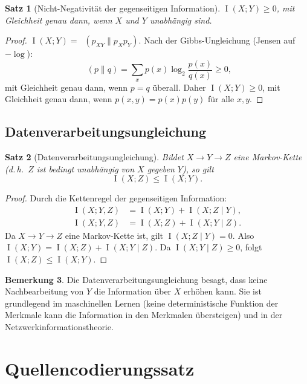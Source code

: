 \documentclass[12pt,a4paper]{amsart}
\newtheorem{theorem}{Satz}[section]
\theoremstyle{definition}
\newtheorem{bemerkung}[theorem]{Bemerkung}
\theoremstyle{remark}
\DeclareMathOperator{\MI}{I}
\DeclareMathOperator{\KL}{D_{KL}}
\begin{document}
\begin{theorem}[Nicht-Negativität der gegenseitigen Information]\label{satz:mi-nichtneg}
$\MI(X;Y) \geq 0$, mit Gleichheit genau dann, wenn $X$ und $Y$ unabhängig sind.
\end{theorem}
\begin{proof}
$\MI(X;Y) = \KL(p_{XY}\|p_Xp_Y)$. Nach der Gibbs-Ungleichung (Jensen auf
$-\log$):
\[
  \KL(p \| q) = \sum_x p(x)\log_2\frac{p(x)}{q(x)} \geq 0,
\]
mit Gleichheit genau dann, wenn $p = q$ überall. Daher $\MI(X;Y) \geq 0$, mit
Gleichheit genau dann, wenn $p(x,y) = p(x)p(y)$ für alle $x,y$.
\end{proof}

\subsection{Datenverarbeitungsungleichung}

\begin{theorem}[Datenverarbeitungsungleichung]\label{satz:dpu}
Bildet $X \to Y \to Z$ eine Markov-Kette (d.\,h.\ $Z$ ist bedingt unabhängig
von $X$ gegeben $Y$), so gilt
\[
  \MI(X;Z) \leq \MI(X;Y).
\]
\end{theorem}
\begin{proof}
Durch die Kettenregel der gegenseitigen Information:
\begin{align*}
  \MI(X;Y,Z) &= \MI(X;Y) + \MI(X;Z\mid Y), \\
  \MI(X;Y,Z) &= \MI(X;Z) + \MI(X;Y\mid Z).
\end{align*}
Da $X \to Y \to Z$ eine Markov-Kette ist, gilt $\MI(X;Z \mid Y) = 0$. Also
$\MI(X;Y) = \MI(X;Z) + \MI(X;Y \mid Z)$.
Da $\MI(X;Y\mid Z) \geq 0$, folgt $\MI(X;Z) \leq \MI(X;Y)$.
\end{proof}

\begin{bemerkung}
Die Datenverarbeitungsungleichung besagt, dass keine Nachbearbeitung von $Y$
die Information über $X$ erhöhen kann. Sie ist grundlegend im maschinellen Lernen
(keine deterministische Funktion der Merkmale kann die Information in den
Merkmalen übersteigen) und in der Netzwerkinformationstheorie.
\end{bemerkung}

\section{Quellencodierungssatz}
\end{document}
